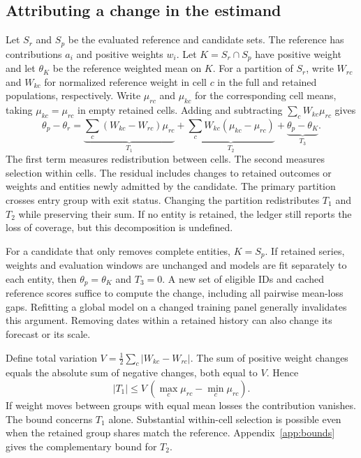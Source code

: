\documentclass[linenumber]{jdsart}
\begin{document}
\subsection{Attributing a change in the estimand}\label{sec:identity}
Let \(S_r\) and \(S_p\) be the evaluated reference and candidate sets. The reference has contributions \(a_i\) and positive weights \(w_i\). Let \(K=S_r\cap S_p\) have positive weight and let \(\theta_K\) be the reference weighted mean on \(K\). For a partition of \(S_r\), write \(W_{rc}\) and \(W_{kc}\) for normalized reference weight in cell \(c\) in the full and retained populations, respectively. Write \(\mu_{rc}\) and \(\mu_{kc}\) for the corresponding cell means, taking \(\mu_{kc}=\mu_{rc}\) in empty retained cells. Adding and subtracting \(\sum_c W_{kc}\mu_{rc}\) gives
\begin{equation}
\theta_p-\theta_r =
\underbrace{\sum_c(W_{kc}-W_{rc})\mu_{rc}}_{T_1}
+\underbrace{\sum_cW_{kc}(\mu_{kc}-\mu_{rc})}_{T_2}
+\underbrace{\theta_p-\theta_K}_{T_3}. \label{eq:decomp}
\end{equation}
The first term measures redistribution between cells. The second measures selection within cells. The residual includes changes to retained outcomes or weights and entities newly admitted by the candidate. The primary partition crosses entry group with exit status. Changing the partition redistributes \(T_1\) and \(T_2\) while preserving their sum. If no entity is retained, the ledger still reports the loss of coverage, but this decomposition is undefined.

For a candidate that only removes complete entities, \(K=S_p\). If retained series, weights and evaluation windows are unchanged and models are fit separately to each entity, then \(\theta_p=\theta_K\) and \(T_3=0\). A new set of eligible IDs and cached reference scores suffice to compute the change, including all pairwise mean-loss gaps. Refitting a global model on a changed training panel generally invalidates this argument. Removing dates within a retained history can also change its forecast or its scale.

Define total variation \(V=\tfrac12\sum_c|W_{kc}-W_{rc}|\). The sum of positive weight changes equals the absolute sum of negative changes, both equal to \(V\). Hence
\begin{equation}
 |T_1|\le V\,(\max_c\mu_{rc}-\min_c\mu_{rc}). \label{eq:bound}
\end{equation}
If weight moves between groups with equal mean losses the contribution vanishes. The bound concerns \(T_1\) alone. Substantial within-cell selection is possible even when the retained group shares match the reference. Appendix~\ref{app:bounds} gives the complementary bound for \(T_2\).
\end{document}
